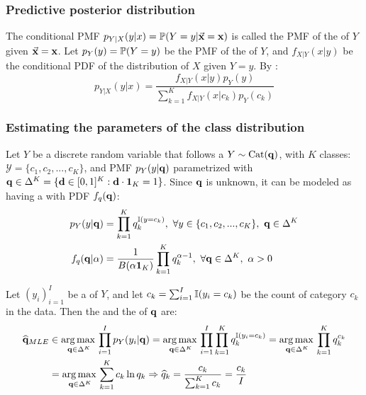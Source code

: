\subsubsection{Predictive posterior distribution}

The conditional PMF $p_{Y|X}(y|x)=\operatorname{\mathbb{P}}(Y=y|\va{x}=\vb{x})$ is called the PMF of the  of $Y$ given $\va{x}=\vb{x}$. Let $p_Y(y)=\operatorname{\mathbb{P}}(Y=y)$ be the PMF of the  of $Y$, and $f_{X|Y}(x|y)$ be the conditional PDF of the distribution of $X$ given $Y=y$. By :
\begin{equation*}
    p_{Y|X}(y|x)= \frac{f_{X|Y}(x|y)p_Y(y)}{\sum_{k=1}^Kf_{X|Y}(x|c_k)p_Y(c_k)}
\end{equation*}

\subsubsection{Estimating the parameters of the class distribution}



Let $Y$ be a discrete random variable that follows a 
 $Y\sim\textrm{Cat}(\vb{q})$, with $K$ classes: $\mathcal{Y} =\{c_1,c_2,...,c_K\}$, and PMF $p_Y(y|\vb{q})$ parametrized with $\vb{q}\in \Delta^K = \{\vb{d}\in[0,1]^K: \vb{d}\cdot\vb{1}_K=1 \}$. Since $\vb{q}$ is unknown, it can be modeled as having a   with PDF $f_q(\vb{q})$: 
\begin{align*}
    p_Y(y|\vb{q}) & =\prod_{k=1}^Kq_{k}^{\operatorname{\mathbb{I}}(y=c_k)}, \ \forall y\in\{c_1,c_2,...,c_K\},\ \vb{q}\in \Delta^K \\
    f_q(\vb{q}|\alpha) &= \frac{1}{B(\alpha\vb{1}_K)}\prod_{k=1}^Kq_{k}^{\alpha-1},\ \forall \vb{q}\in \Delta^K,\ \alpha>0
\end{align*}

Let $(y_i)_{i=1}^I$ be a  of $Y$, and let $c_k=\sum_{i=1}^I\operatorname{\mathbb{I}}(y_i=c_k)$ be the count of category $c_k$ in the data. Then the  and the  of $\vb{q}$ are:
\begin{align*}
    \widehat{\vb{q}}_{MLE} &\in\operatorname*{arg\,max\,}\limits_{\vb{q}\in\Delta^K}\prod_{i=1}^I p_Y(y_i|\vb{q})
    =\operatorname*{arg\,max\,}\limits_{\vb{q}\in\Delta^K}\prod_{i=1}^I \prod_{k=1}^Kq_{k}^{\operatorname{\mathbb{I}}(y_i=c_k)}
    =\operatorname*{arg\,max\,}\limits_{\vb{q}\in\Delta^K} \prod_{k=1}^Kq_{k}^{c_k} \\
    &=\operatorname*{arg\,max\,}\limits_{\vb{q}\in\Delta^K}\sum_{k=1}^Kc_k\ln q_{k} \Rightarrow \widehat{q}_k=\frac{c_k}{\sum_{k=1}^Kc_k}=\frac{c_k}{I}
\end{align*}

